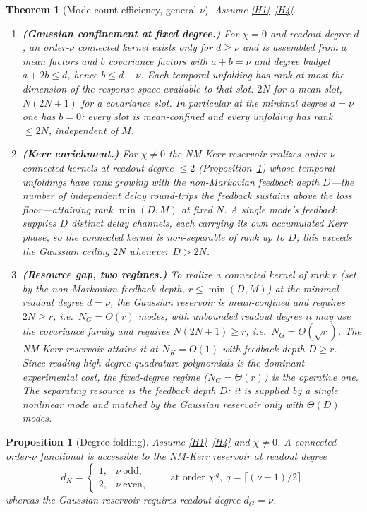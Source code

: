 \documentclass[10pt,a4paper]{amsart}
\newtheorem{theorem}{Theorem}
\newtheorem{proposition}{Proposition}
\begin{document}
\begin{theorem}[Mode-count efficiency, general $\nu$]
\label{thm:scaling}
Assume \ref{H1}--\ref{H4}.
\begin{enumerate}[label=(\alph*)]
\item \textbf{(Gaussian confinement at fixed degree.)} For $\chi=0$ and readout
degree $d$, an order-$\nu$ connected kernel exists only for $d\ge\nu$ and is
assembled from $a$ mean factors and $b$ covariance factors with $a+b=\nu$ and
degree budget $a+2b\le d$, hence $b\le d-\nu$. Each temporal unfolding has rank at
most the dimension of the response space available to that slot: $2N$ for a
mean slot, $N(2N{+}1)$ for a covariance slot. In particular at the minimal degree
$d=\nu$ one has $b=0$: every slot is mean-confined and every unfolding has rank
$\le 2N$, independent of $M$.
\item \textbf{(Kerr enrichment.)} For $\chi\neq0$ the NM-Kerr reservoir realizes
order-$\nu$ connected kernels at readout degree $\le2$
(Proposition~\ref{prop:degree}) whose temporal unfoldings have rank growing with
the \emph{non-Markovian feedback depth} $D$---the number of independent delay
round-trips the feedback sustains above the loss floor---attaining rank
$\min(D,M)$ at fixed $N$. A single mode's feedback supplies $D$ distinct delay
channels, each carrying its own accumulated Kerr phase, so the connected kernel is
non-separable of rank up to $D$; this exceeds the Gaussian ceiling $2N$ whenever
$D>2N$.
\item \textbf{(Resource gap, two regimes.)} To realize a connected kernel of rank
$r$ (set by the non-Markovian feedback depth, $r\le\min(D,M)$) at the minimal
readout degree $d=\nu$, the Gaussian reservoir is mean-confined and requires
$2N\ge r$, i.e.\ $N_G=\Theta(r)$ modes; with unbounded readout degree it may use
the covariance family and requires $N(2N{+}1)\ge r$, i.e.\ $N_G=\Theta(\sqrt r)$.
The NM-Kerr reservoir attains it at $N_K=O(1)$ with feedback depth $D\ge r$. Since
reading high-degree quadrature polynomials is the dominant experimental cost, the
fixed-degree regime ($N_G=\Theta(r)$) is the operative one. The separating
resource is the feedback depth $D$: it is supplied by a single nonlinear mode and
matched by the Gaussian reservoir only with $\Theta(D)$ modes.
\end{enumerate}
\end{theorem}

\begin{proposition}[Degree folding]
\label{prop:degree}
Assume \ref{H1}--\ref{H4} and $\chi\neq0$. A connected order-$\nu$ functional is
accessible to the NM-Kerr reservoir at readout degree
\[
d_K = \begin{cases} 1, & \nu\ \text{odd},\\ 2, & \nu\ \text{even},\end{cases}
\qquad\text{at order }\chi^{\,q},\ q=\big\lceil(\nu-1)/2\big\rceil,
\]
whereas the Gaussian reservoir requires readout degree $d_G=\nu$.
\end{proposition}
\end{document}
